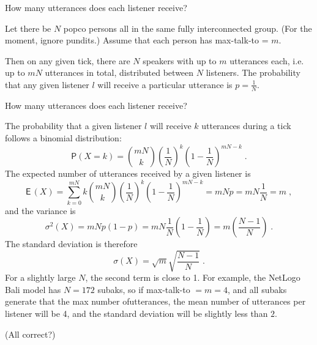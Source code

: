 \documentclass[12pt]{article}
\makeatletter
\newcommand{\ie}{i.e.\@\xspace}
\newcommand{\pr}{\mathsf{P}} %
\newcommand{\expct}{\mathsf E\,}
\newcommand{\var}{\sigma^2}
\newcommand{\stdv}{\sigma}
\newcommand{\comb}[2]{{{#1}\choose{#2}}}
\makeatother
\begin{document}

{\Large\sc How many utterances does each listener receive?}

Let there be $N$ popco persons all in the same fully
interconnected group.  (For the moment, ignore pundits.)  Assume
that each person has {\sf max-talk-to} = $m$.

Then on any given tick, there are $N$ speakers with up to $m$ utterances
each, \ie up to $mN$ utterances in total, distributed between $N$
listeners.  The probability that any given listener $l$ will
receive a particular utterance is $p=\frac{1}{N}$.

How many utterances does each listener receive?

The probability that a given listener $l$ will receive $k$
utterances during a tick follows a binomial distribution:
\[
    \pr(X=k) = \comb{mN}{k} \left(\frac{1}{N}\right)^k
    \left(1-\frac{1}{N}\right)^{mN-k} \;.
\]
The expected number of utterances received by a given listener is
\[
    \expct(X) = \sum_{k=0}^{mN}k\comb{mN}{k}
    \left(\frac{1}{N}\right)^k \left(1-\frac{1}{N}\right)^{mN-k}
    = mNp = mN\frac{1}{N} = m \;,
\]
and the variance is
\[
    \var(X) = mNp(1-p) = mN\frac{1}{N}\left(1-\frac{1}{N}\right)
    = m\left(\frac{N-1}{N}\right) \;.
\]
The standard deviation is therefore
\[
    \stdv(X) = \sqrt{m}\sqrt{\frac{N-1}{N}} \;.
\]
For a slightly large $N$, the second term is close to 1.  For
example, the NetLogo Bali model has $N=172$ subaks, so if {\sf
max-talk-to} $=m=4$, and all subaks generate that the max number
ofutterances, the mean number of utterances per listener will be
4, and the standard deviation will be slightly less than $2$.

(All correct?)
\end{document}
